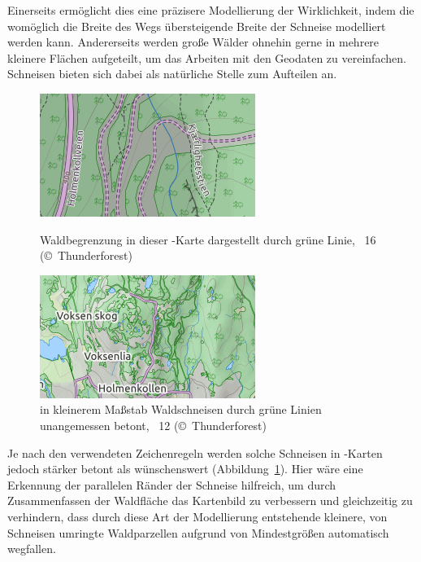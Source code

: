 \documentclass[../main/thesis.tex]{subfiles}
\begin{document}
Einerseits ermöglicht dies eine präzisere Modellierung der Wirklichkeit, indem die womöglich die Breite des Wegs übersteigende Breite der Schneise modelliert werden kann.
Andererseits werden große Wälder ohnehin gerne in mehrere kleinere Flächen aufgeteilt, um das Arbeiten mit den Geodaten zu vereinfachen.
Schneisen bieten sich dabei als natürliche Stelle zum Aufteilen an.

\begin{figure}[ht]
  \begin{minipage}[t]{.5\linewidth}
    \centering
    \includegraphics[width=\ScaleIfNeeded]{../chapter3/vegetation-swath-z16}
    \caption{Waldbegrenzung in dieser \osm-Karte dargestellt durch grüne Linie, ~16 (©~Thunderforest)}\label{fig:vegetation-swath-z16}
  \end{minipage}%
  \begin{minipage}[t]{.5\linewidth}
    \centering
    \includegraphics[width=\ScaleIfNeeded]{../chapter3/vegetation-swath-z12}
    \caption{in kleinerem Maßstab Waldschneisen durch grüne Linien unangemessen betont, ~12 (©~Thunderforest)}\label{fig:vegetation-swath-z12}
  \end{minipage}
\end{figure}

Je nach den verwendeten Zeichenregeln werden solche Schneisen in \osm-Karten jedoch stärker betont als wünschenswert (Abbildung~\ref{fig:vegetation-swath-z12}).
Hier wäre eine Erkennung der parallelen Ränder der Schneise hilfreich, um durch Zusammenfassen der Waldfläche das Kartenbild zu verbessern und gleichzeitig zu verhindern, dass durch diese Art der Modellierung entstehende kleinere, von Schneisen umringte Waldparzellen aufgrund von Mindestgrößen automatisch wegfallen.
\end{document}

